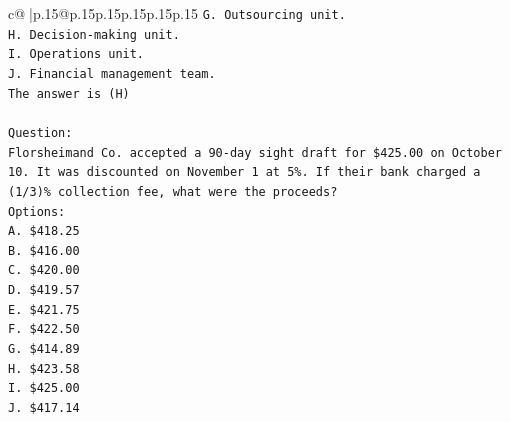 \documentclass{article}
\begin{document}
{\begin{supertabular}{c@{$\;$}|p{.15\linewidth}@{}p{.15\linewidth}p{.15\linewidth}p{.15\linewidth}p{.15\linewidth}p{.15\linewidth}}
{{{\texttt{G. Outsourcing unit.} \\
\texttt{H. Decision{-}making unit.} \\
\texttt{I. Operations unit.} \\
\texttt{J. Financial management team.} \\
\texttt{The answer is (H)} \\
\\ 
\texttt{Question:} \\
\texttt{Florsheimand Co. accepted a 90{-}day sight draft for \$425.00 on October 10. It was discounted on November 1 at 5\%. If their bank charged a (1/3)\% collection fee, what were the proceeds?} \\
\texttt{Options:} \\
\texttt{A. \$418.25} \\
\texttt{B. \$416.00} \\
\texttt{C. \$420.00} \\
\texttt{D. \$419.57} \\
\texttt{E. \$421.75} \\
\texttt{F. \$422.50} \\
\texttt{G. \$414.89} \\
\texttt{H. \$423.58} \\
\texttt{I. \$425.00} \\
\texttt{J. \$417.14} \\
            }
        }
    }
     \\ \\


\end{supertabular}}
\end{document}

